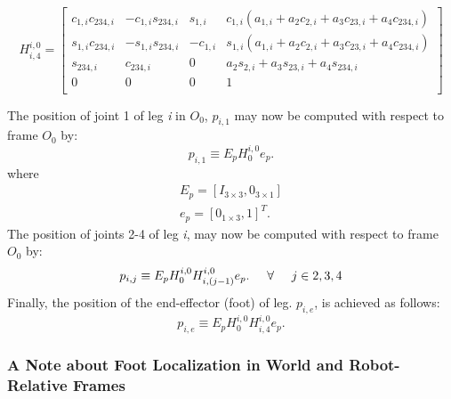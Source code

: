 				\begin{equation}
					H^{i,0}_{i,4} =\left[ 
					\begin{array}{ccc|c}
						c_{1,i} c_{234,i}	&  		-c_{1,i} s_{234,i}	& 		s_{1,i}		&		c_{1,i}( a_{1,i} + a_2 c_{2,i} + a_3 c_{23,i} + a_4 c_{234,i} )		\\
						s_{1,i} c_{234,i}	&  		-s_{1,i} s_{234,i}	& 		-c_{1,i}	&		s_{1,i}( a_{1,i} + a_2 c_{2,i} + a_3 c_{23,i} + a_4 c_{234,i} )		\\
						s_{234,i} 		&  		c_{234,i}		& 		0			&		a_2 s_{2,i} + a_3 s_{23,i} + a_4 s_{234,i}					\\ \hline
						0 			& 		0			& 		0			&		1 															\\
					\end{array} 
					\right]
				\end{equation}

			\noindent
			The position of joint 1 of leg \emph{i} in $O_{0}$, ${p}_{i,1}$ may now be computed with respect to frame $O_{0}$ by:
				\begin{equation}
					{p}_{i,1} \equiv E_{p} H_{0}^{i,0} e_{p}.
				\end{equation}
			where
				\begin{eqnarray}
					E_{p} = [I_{3\times3},0_{3\times1}]	\nonumber 	\\
					e_{p} = [0_{1\times3},1]^T.			\nonumber 	
				\end{eqnarray}
			The position of joints 2-4 of leg \emph{i}, may now be computed with respect to frame $O_{0}$ by:
				\begin{equation}
					{p}_{i,j} \equiv E_{p} H_{0}^{i,0} {H}^{i,0}_{i,(j-1)} e_{p}. \hspace{5mm} \forall \hspace{5mm} j\in{2,3,4}
					\label{eq::world_joint_positions}
				\end{equation}
			Finally, the position of the end-effector (foot) of \Ith leg. ${p}_{i,e}$, is achieved as follows:
				\begin{equation}
					{p}_{i,e} \equiv E_{p} H_{0}^{i,0} {H}^{i,0}_{i,4} e_{p}.
					\label{eq::world_feet_positions}
				\end{equation}

			\subsubsection{A Note about Foot Localization in World and Robot-Relative Frames}

